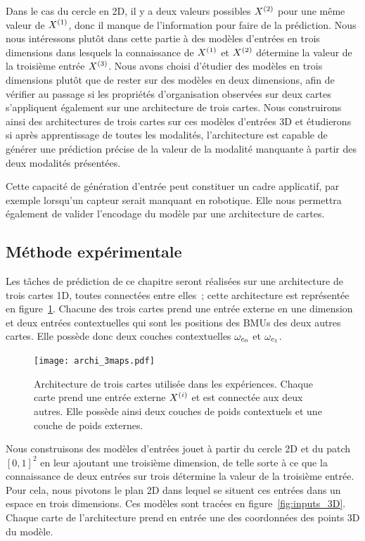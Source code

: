 \documentclass[../main]{subfiles}
\begin{document}
Dans le cas du cercle en 2D, il y a deux valeurs possibles $X^{({2})}$ pour une même valeur de $X^{({1})}$, donc il manque de l'information pour faire de la prédiction.
Nous nous intéressons plutôt dans cette partie à des modèles d'entrées en trois dimensions dans lesquels la connaissance de $X^{({1})}$ et $X^{({2})}$ détermine la valeur de la troisième entrée $X^{({3})}$.
Nous avons choisi d'étudier des modèles en trois dimensions plutôt que de rester sur des modèles en deux dimensions, afin de vérifier au passage si les propriétés d'organisation observées sur deux cartes s'appliquent également sur une architecture de trois cartes.
Nous construirons ainsi des architectures de trois cartes sur ces modèles d'entrées 3D et étudierons si après apprentissage de toutes les modalités, l'architecture est capable de générer une prédiction précise de la valeur de la modalité manquante à partir des deux modalités présentées.

Cette capacité de génération d'entrée peut constituer un cadre applicatif, par exemple lorsqu'un capteur serait manquant en robotique. 
Elle nous permettra également de valider l'encodage du modèle par une architecture de cartes.

\subsection{Méthode expérimentale}

Les tâches de prédiction de ce chapitre seront réalisées sur une architecture de trois cartes 1D, toutes connectées entre elles~; cette architecture est représentée en figure~\ref{fig:archi_3maps}.
Chacune des trois cartes prend une entrée externe en une dimension et deux entrées contextuelles qui sont les positions des BMUs des deux autres cartes. Elle possède donc deux couches contextuelles $\omega_{c_0}$ et $\omega_{c_1}$.

\begin{figure}
	\centering\texttt{[image: archi\_3maps.pdf]}
	\caption{Architecture de trois cartes utilisée dans les expériences. Chaque carte prend une entrée externe $X^{({i})}$ et est connectée aux deux autres. Elle possède ainsi deux couches de poids contextuels et une couche de poids externes.\label{fig:archi_3maps}}
\end{figure}

Nous construisons des modèles d'entrées jouet à partir du cercle 2D et du patch $[0,1]^2$ en leur ajoutant une troisième dimension, de telle sorte à ce que la connaissance de deux entrées sur trois détermine la valeur de la troisième entrée. Pour cela, nous pivotons le plan 2D dans lequel se situent ces entrées dans un espace en trois dimensions.
Ces modèles sont tracées en figure~\ref{fig:inputs_3D}.
Chaque carte de l'architecture prend en entrée une des coordonnées des points 3D du modèle.
\end{document}
